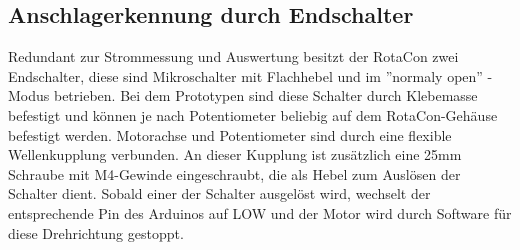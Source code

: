 \documentclass[11pt, titlepage]{report}
\begin{document}
			\subsection{Anschlagerkennung durch Endschalter}
				Redundant zur Strommessung und Auswertung besitzt der RotaCon zwei Endschalter, diese sind Mikroschalter mit Flachhebel und im ''normaly open'' -Modus betrieben. Bei dem Prototypen sind diese Schalter durch Klebemasse befestigt und können je nach Potentiometer beliebig auf dem RotaCon-Gehäuse befestigt werden. Motorachse und Potentiometer sind durch eine flexible Wellenkupplung verbunden. An dieser Kupplung ist zusätzlich eine 25mm Schraube mit M4-Gewinde eingeschraubt, die als Hebel zum Auslösen der Schalter dient. Sobald einer der Schalter ausgelöst wird, wechselt der entsprechende Pin des Arduinos auf LOW und der Motor wird durch Software für diese Drehrichtung gestoppt.
\end{document}
